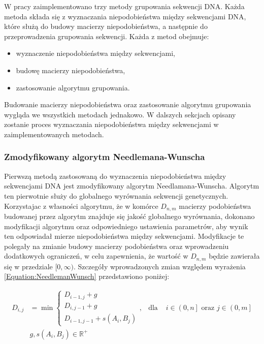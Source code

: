         W pracy zaimplementowano trzy metody grupowania sekwencji DNA. Każda metoda składa się z wyznaczania niepodobieństwa między sekwencjami DNA, które służą do budowy macierzy niepodobieństwa, a następnie do przeprowadzenia grupowania sekwencji. Każda z metod obejmuje:

        \begin{itemize}
            \item {wyznaczenie niepodobieństwa między sekwencjami,}
            \item {budowę macierzy niepodobieństwa,}
            \item {zastosowanie algorytmu grupowania.}
        \end{itemize}

        Budowanie macierzy niepodobieństwa oraz zastosowanie algorytmu grupowania wygląda we wszystkich metodach jednakowo. W dalszych sekcjach opisany zostanie proces wyznaczania niepodobieństwa między sekwencjami w zaimplementowanych metodach.
        
        \subsubsection{Zmodyfikowany algorytm Needlemana-Wunscha}

            Pierwszą metodą zastosowaną do wyznaczenia niepodobieństwa między sekwencjami DNA jest  zmodyfikowany algorytm Needlamana-Wunscha. Algorytm ten pierwotnie służy do globalnego wyrównania sekwencji genetycznych. Korzystajac z własności algorytmu, że w komórce $D_{n, m}$ macierzy podobieństwa budowanej przez algorytm znajduje się jakość globalnego wyrównania, dokonano modyfikacji algorytmu oraz odpowiedniego ustawienia parametrów, aby wynik ten odpowiadał mierze niepodobieństwa między sekwencjami. Modyfikacje te polegały na zmianie budowy macierzy podobieństwa oraz wprowadzeniu dodatkowych ograniczeń, w celu zapewnienia, że wartość w $D_{n, m}$ będzie zawierała się w przedziale $[0, \infty)$. Szczegóły wprowadzonych zmian względem wyrażenia \eqref{Equation:NeedlemanWunsch} przedstawiono poniżej:

            \begin{equation}
                \begin{aligned}
                    D_{i,j} &= \min
                    \begin{cases}
                    D_{i - 1, j} + g \\
                    D_{i, j - 1} + g \\
                    D_{i - 1, j - 1} + s(A_i, B_j)
                    \end{cases}, & \text{dla } & i \in \left(0, n\right] \text{ oraz } j \in \left(0, m\right] \\
                    & g, s(A_i, B_j) \in \mathbb{R}^{+}
                \end{aligned}
            \end{equation}

